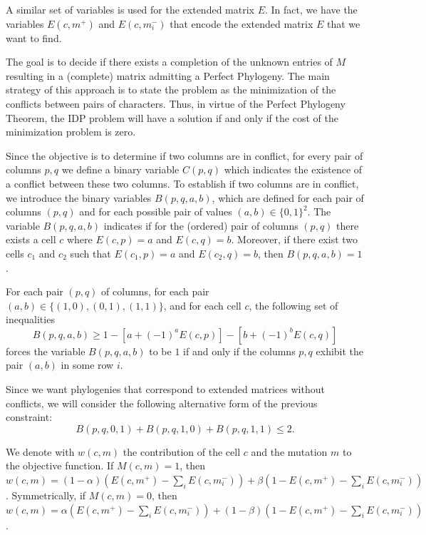 \documentclass[a4paper,USenglish]{article}
\theoremstyle{definition}
\begin{document}
A similar set of variables is used for the extended matrix $E$.
In fact, we have the variables $E(c,m^{+})$ and $E(c,m_{i}^{-})$ that encode the extended
matrix $E$ that we want to find.


The goal is to decide if there exists a completion of the unknown
entries  of $M$ resulting in
a (complete) matrix  admitting a Perfect Phylogeny.
The main  strategy of  this approach  is to state  the problem  as the
  minimization of the conflicts between pairs of characters. 
Thus, in virtue of the  Perfect Phylogeny Theorem, the IDP problem
will have a solution if and only if the cost of the minimization problem
is zero.  




Since the objective is to determine if two columns are in conflict,
  for every pair of columns $p,q$ we define a  binary variable $C(p,q)$
  which indicates the existence of a conflict between these two columns.
To establish if two columns are in conflict, we introduce the binary variables 
   $B(p,q,a,b)$, which  are defined for each pair of columns $(p,q)$ and for each
   possible  pair  of  values  $(a,b)\in \{0,1\}^2$.
The variable $B(p,q,a,b)$ indicates if for the (ordered) pair of columns $(p,q)$
  there  exists a cell $c$ where $E(c,p)=a$ and $E(c,q)=b$.
Moreover, if there exist two cells $c_{1}$ and $c_{2}$ such that 
  $E(c_{1},p)=a$ and $E(c_{2},q)=b$, then $B(p,q,a,b)=1$.

For each pair $(p,q)$ of columns, for each pair $(a,b)\in
\{(1,0),(0,1),(1,1)\} $, and for each cell $c$, the following set of inequalities 
\begin{equation}\label{eq:B}
   B(p,q,a,b)\ge 1-[a+(-1)^{a} E(c,p)]-[b+(-1)^{b}
  E(c,q)]
  \end{equation}
  forces the variable $B(p,q,a,b)$ to be $1$ if and only if the columns $p,q$
  exhibit the pair $(a,b)$ in some row $i$.

Since we want phylogenies that correspond to extended matrices without conflicts,
we  will  consider  the   following  alternative  form  of  the  previous
constraint: 
\begin{equation}\label{eq:C=0}
   B(p,q,0,1) + B(p,q,1,0) + B(p,q,1,1)\le 2.  
\end{equation}

We denote with $w(c,m)$ the contribution of the cell $c$ and the mutation $m$ to the
objective function.
If $M(c,m)=1$, then $w(c,m) = \left(1 - \alpha\right) \left( E(c,m^{+}) - \sum_{i} E(c, m_{i}^{-}) \right)
+  \beta \left( 1 - E(c,m^{+}) - \sum_{i} E(c, m_{i}^{-}) \right)$.
Symmetrically, if  $M(c,m)=0$, then $w(c,m) = \alpha \left( E(c,m^{+}) - \sum_{i} E(c, m_{i}^{-}) \right)
+  \left(1 - \beta\right) \left( 1 - E(c,m^{+}) - \sum_{i} E(c, m_{i}^{-}) \right)$.
\end{document}

